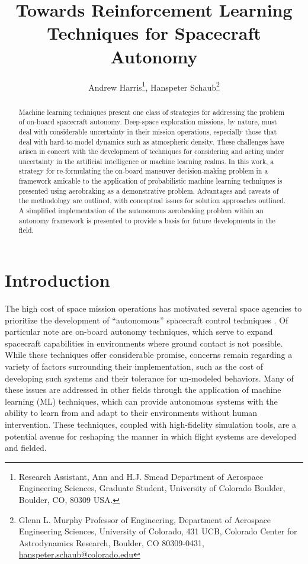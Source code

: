\documentclass[paper,11pt]{AAS}		%
\begin{document}
\title{Towards Reinforcement Learning Techniques for Spacecraft Autonomy}

\author{Andrew Harris\thanks{Research Assistant, Ann and H.J. Smead Department of Aerospace Engineering Sciences, Graduate 
Student, University of Colorado Boulder, Boulder,
		CO, 80309 USA.},
		Hanspeter Schaub\thanks{Glenn L. Murphy Professor of Engineering, Department of Aerospace Engineering Sciences, 
			University of Colorado, 431 UCB, Colorado Center for Astrodynamics Research, Boulder, CO 80309-0431,  
		\href{mailto:hanspeter.schaub@colorado.edu}{hanspeter.schaub@colorado.edu}}
}


\maketitle{} 		


\begin{abstract}
Machine learning techniques present one class of strategies for addressing the problem of on-board spacecraft autonomy. Deep-space exploration missions, by nature, must deal with considerable uncertainty in their mission operations, especially those that deal with hard-to-model dynamics such as   atmospheric density. These challenges have arisen in concert with the development of techniques for considering and acting under uncertainty in the artificial intelligence or machine learning realms. In this work, a strategy for re-formulating the on-board maneuver decision-making problem in a framework amicable to the application of probabilistic machine learning techniques is presented using aerobraking as a demonstrative problem. Advantages and caveats of the methodology are outlined, with conceptual issues for solution approaches outlined. A simplified implementation of the autonomous aerobraking problem within an autonomy framework is presented to provide a basis for future developments in the field.
\end{abstract}


\section{Introduction}

The high cost of space mission operations has motivated several space agencies to prioritize the development of ``autonomous'' spacecraft control techniques \cite{Pecheur2000}. Of particular note are on-board autonomy techniques, which serve to expand spacecraft capabilities in environments where ground contact is not possible. While these techniques offer considerable promise, concerns remain regarding a variety of factors surrounding their implementation, such as the cost of developing such systems and their tolerance for un-modeled behaviors\cite{Starek2016}. Many of these issues are addressed in other fields through the application of machine learning (ML) techniques, which can provide autonomous systems with the ability to learn from and adapt to their environments without human intervention. These techniques, coupled with high-fidelity simulation tools, are a potential avenue for reshaping the manner in which flight systems are developed and fielded. 
\end{document}

